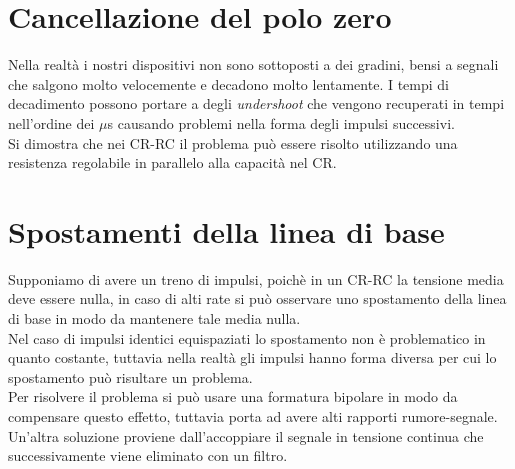 \section{Cancellazione del polo zero}
Nella realt\`a i nostri dispositivi non sono sottoposti a dei gradini, bensi a segnali che salgono molto velocemente e decadono molto lentamente.
I tempi di decadimento possono portare a degli \textit{undershoot} che vengono recuperati in tempi nell'ordine dei $\mu$s causando problemi nella forma degli
impulsi successivi. \\
Si dimostra che nei CR-RC il problema pu\`o essere risolto utilizzando una resistenza regolabile in parallelo alla capacit\`a nel CR.
\section{Spostamenti della linea di base}
Supponiamo di avere un treno di impulsi, poich\`e in un CR-RC la tensione media deve essere nulla, in caso di alti rate si pu\`o osservare uno spostamento
della linea di base in modo da mantenere tale media nulla.\\
Nel caso di impulsi identici equispaziati lo spostamento non \`e problematico in quanto costante, tuttavia nella realt\`a gli impulsi hanno forma diversa per cui lo spostamento
pu\`o risultare un problema.\\
Per risolvere il problema si pu\`o usare una formatura bipolare in modo da compensare questo effetto, tuttavia porta ad avere alti rapporti rumore-segnale.
Un'altra soluzione proviene dall'accoppiare il segnale in tensione continua che successivamente viene eliminato con un filtro.